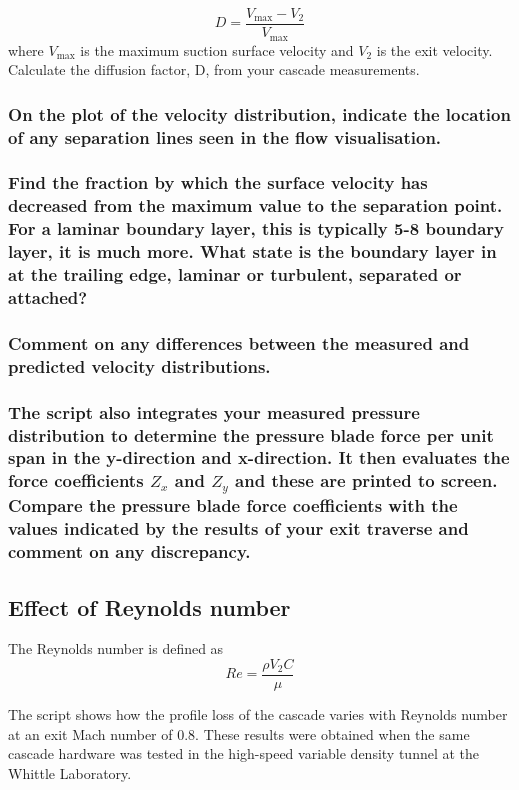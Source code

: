 \documentclass{article}
\begin{document}
\begin{equation}
    D = \frac{V_\text{max} - V_2}{V_\text{max}}
\end{equation}
where
$V_\text{max}$ is the maximum suction surface velocity and
$V_2$ is the exit velocity. Calculate the
diffusion factor, D, from your cascade measurements.

\subsubsection{On the plot of the velocity distribution, indicate the location of any separation lines seen
in the flow visualisation.}


\subsubsection{Find the fraction by which the surface velocity has decreased from the maximum value
to the separation point. For a laminar boundary layer, this is typically 5-8%
boundary layer, it is much more. What state is the boundary layer in at the trailing edge, laminar
or turbulent, separated or attached?}


\subsubsection{Comment on any differences between the measured and predicted velocity
distributions.}


\subsubsection{The script also integrates your measured pressure distribution to determine the pressure
blade force per unit span in the y-direction and x-direction. It then evaluates the force
coefficients $Z_x$ and $Z_y$ and these are printed to screen.
Compare the pressure blade force coefficients with the values indicated by the results of your
exit traverse and comment on any discrepancy.}


\subsection{Effect of Reynolds number}

The Reynolds number is defined as
\begin{equation}
    Re = \frac{\rho V_2 C}{\mu}
\end{equation}

The script shows how the profile loss of the cascade varies with Reynolds number at an exit
Mach number of 0.8. These results were obtained when the same cascade hardware was tested
in the high-speed variable density tunnel at the Whittle Laboratory.
\end{document}
